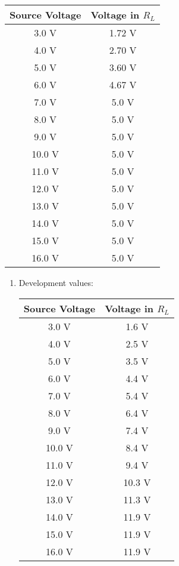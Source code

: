 \begin{tasks}
\begin{multicols}{2}
\begin{enumerate}
\begin{center}
\begin{tabular}[.5cm]{ c c }
\toprule
Source Voltage & Voltage in $R_{L}$ \\
\midrule
3.0 V & 1.72 V \\
\cmidrule{1-2}
4.0 V & 2.70 V \\
\cmidrule{1-2}
5.0 V & 3.60 V \\
\cmidrule{1-2}
6.0 V & 4.67 V \\
\cmidrule{1-2}
7.0 V & 5.0 V \\
\cmidrule{1-2}
8.0 V & 5.0 V \\
\cmidrule{1-2}
9.0 V & 5.0 V \\
\cmidrule{1-2}
10.0 V & 5.0 V \\
\cmidrule{1-2}
11.0 V & 5.0 V \\
\cmidrule{1-2}
12.0 V & 5.0 V \\
\cmidrule{1-2}
13.0 V & 5.0 V \\
\cmidrule{1-2}
14.0 V & 5.0 V \\
\cmidrule{1-2}
15.0 V & 5.0 V \\
\cmidrule{1-2}
16.0 V & 5.0 V \\
\bottomrule
\end{tabular}
\end{center} 
\end{enumerate}
\end{multicols}


\begin{multicols}{2}

\begin{enumerate}
\item Development values:

\begin{center}
\begin{tabular}[.5cm]{ c c }
\toprule
Source Voltage & Voltage in $R_{L}$ \\
\midrule
3.0 V & 1.6 V \\
\cmidrule{1-2}
4.0 V & 2.5 V \\
\cmidrule{1-2}
5.0 V & 3.5 V \\
\cmidrule{1-2}
6.0 V & 4.4 V \\
\cmidrule{1-2}
7.0 V & 5.4 V \\
\cmidrule{1-2}
8.0 V & 6.4 V \\
\cmidrule{1-2}
9.0 V & 7.4 V \\
\cmidrule{1-2}
10.0 V & 8.4 V \\
\cmidrule{1-2}
11.0 V & 9.4 V \\
\cmidrule{1-2}
12.0 V & 10.3 V \\
\cmidrule{1-2}
13.0 V & 11.3 V \\
\cmidrule{1-2}
14.0 V & 11.9 V \\
\cmidrule{1-2}
15.0 V & 11.9 V \\
\cmidrule{1-2}
16.0 V & 11.9 V \\
\bottomrule
\end{tabular}
\end{center} 


\end{enumerate}
\end{multicols}
\end{tasks}
